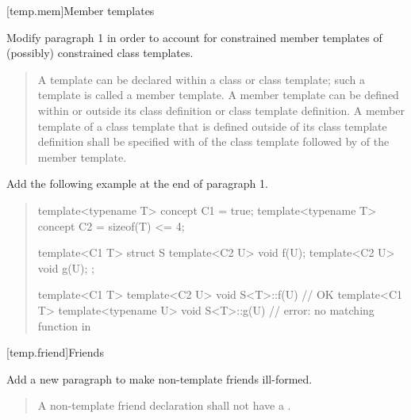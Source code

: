 [temp.mem]{Member templates}


Modify paragraph 1 in order to account for constrained member templates
of (possibly) constrained class templates. 

\begin{quote}
\pnum
A template can be declared within a class or class template; such a 
template is called a member template. 
% 
A member template can be defined within or outside its class definition 
or class template definition. 
% 
A member template of a class template that is defined outside of its 
class template definition shall be specified with
of the class template followed by
of the member template.
\end{quote}


Add the following example at the end of paragraph 1.

\begin{quote}
\begin{addedblock}
\enterexample
\begin{codeblock}
template<typename T> concept C1 = true;
template<typename T> concept C2 = sizeof(T) <= 4;

template<C1 T>
  struct S {
    template<C2 U> void f(U);
    template<C2 U> void g(U);
  };

template<C1 T> template<C2 U> 
  void S<T>::f(U) { } // OK
template<C1 T> template<typename U> 
  void S<T>::g(U) { } // error: no matching function in 
\end{codeblock}
\exitexample
\end{addedblock}
\end{quote}


[temp.friend]{Friends}

Add a new paragraph to make non-template friends ill-formed.

\begin{quote}
\begin{addedblock}
\setcounter{Paras}{8}
\pnum
A non-template friend declaration shall not have a .
\end{addedblock}
\end{quote}


